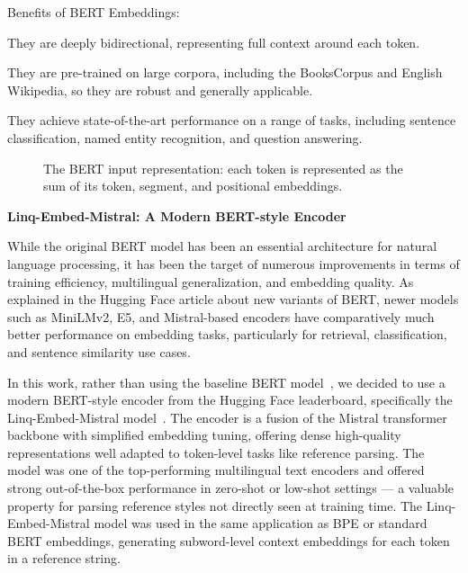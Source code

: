 Benefits of BERT Embeddings:
\begin{compactitem}
\item They are deeply bidirectional, representing full context around each token.
\item They are pre-trained on large corpora, including the BooksCorpus and English Wikipedia, so they are robust and generally applicable.
\item They achieve state-of-the-art performance on a range of tasks, including sentence classification, named entity recognition, and question answering.
\end{compactitem}

\begin{figure}[ht]
    \centering
    
    \caption{The BERT input representation: each token is represented as the sum of its token, segment, and positional embeddings.}
    \label{fig:bert-input}
\end{figure}

\textbf{Linq-Embed-Mistral: A Modern BERT-style Encoder}

While the original BERT model has been an essential architecture for natural language processing, it has been the target of numerous improvements in terms of training efficiency, multilingual generalization, and embedding quality. As explained in the Hugging Face article about new variants of BERT, newer models such as MiniLMv2, E5, and Mistral-based encoders have comparatively much better performance on embedding tasks, particularly for retrieval, classification, and sentence similarity use cases.

In this work, rather than using the baseline BERT model~\cite{2019-bert}, we decided to use a modern BERT-style encoder from the Hugging Face leaderboard, specifically the Linq-Embed-Mistral model~\cite{linq}. The encoder is a fusion of the Mistral transformer backbone with simplified embedding tuning, offering dense high-quality representations well adapted to token-level tasks like reference parsing. The model was one of the top-performing multilingual text encoders and offered strong out-of-the-box performance in zero-shot or low-shot settings — a valuable property for parsing reference styles not directly seen at training time.
The Linq-Embed-Mistral model was used in the same application as BPE or standard BERT embeddings, generating subword-level context embeddings for each token in a reference string.

